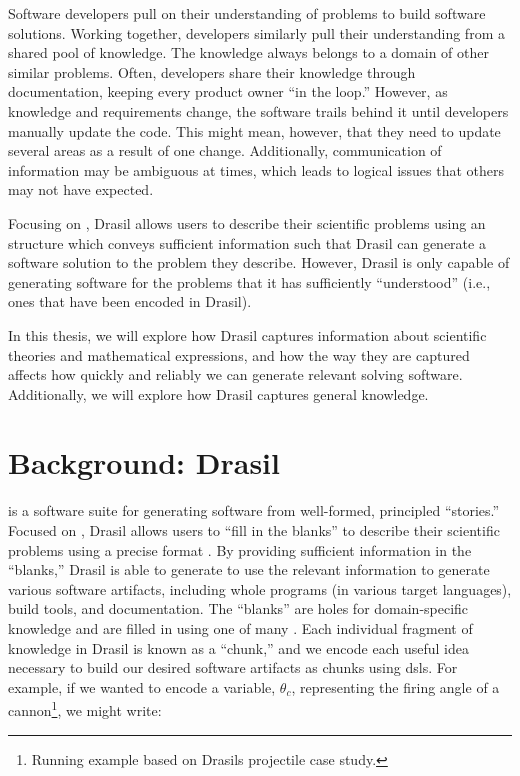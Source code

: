 Software developers pull on their understanding of problems to build software
solutions. Working together, developers similarly pull their understanding from
a shared pool of knowledge. The knowledge always belongs to a domain of other
similar problems. Often, developers share their knowledge through documentation,
keeping every product owner ``in the loop.'' However, as knowledge and
requirements change, the software trails behind it until developers manually
update the code. This might mean, however, that they need to update several
areas as a result of one change. Additionally, communication of information may
be ambiguous at times, which leads to logical issues that others may not have
expected.

Focusing on , Drasil allows users to describe their scientific problems
using an  structure which conveys sufficient information such that
Drasil can generate a software solution to the problem they describe. However,
Drasil is only capable of generating software for the problems that it has
sufficiently ``understood'' (i.e., ones that have been encoded in Drasil).

In this thesis, we will explore how Drasil captures information about scientific
theories and mathematical expressions, and how the way they are captured affects
how quickly and reliably we can generate relevant solving software.
Additionally, we will explore how Drasil captures general knowledge.

\section{Background: Drasil}
\label{chap:introduction:sec:background}

 is a software suite
for generating software from well-formed, principled ``stories.'' Focused on
, Drasil allows users to ``fill in the blanks'' to describe their
scientific problems using a precise  format \cite{SmithAndLai2005}. By
providing sufficient information in the ``blanks,'' Drasil is able to generate
to use the relevant information to generate various software artifacts,
including whole programs (in various target languages), build tools, and
documentation. The ``blanks'' are holes for domain-specific knowledge and are
filled in using one of many . Each individual fragment of knowledge in
Drasil is known as a ``chunk,'' and we encode each useful idea necessary to
build our desired software artifacts as chunks using \acsp{dsl}. For example, if
we wanted to encode a variable, \(\theta{}_{c}\), representing the firing angle
of a cannon\footnote{Running example based on Drasils \acs{projectile} case
      study.}, we might write:

